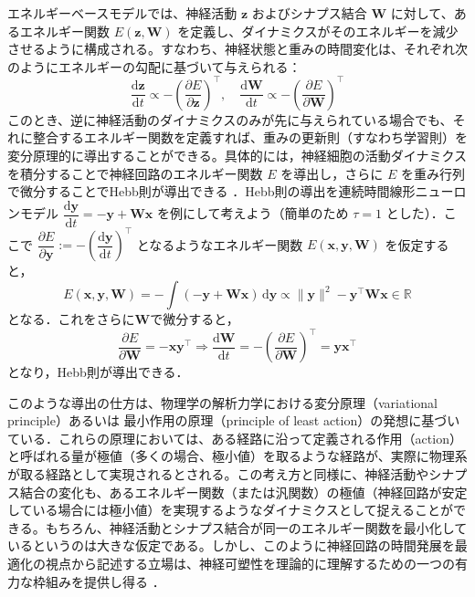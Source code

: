 \documentclass[titlepage]{ltjsbook}
\begin{document}
エネルギーベースモデルでは、神経活動 $\mathbf{z}$ およびシナプス結合 $\mathbf{W}$ に対して、あるエネルギー関数 $E(\mathbf{z}, \mathbf{W})$ を定義し、ダイナミクスがそのエネルギーを減少させるように構成される。すなわち、神経状態と重みの時間変化は、それぞれ次のようにエネルギーの勾配に基づいて与えられる：
\begin{equation}
\frac{\mathrm{d}\mathbf{z}}{\mathrm{d}t}\propto-\left(\frac{\partial E}{\partial \mathbf{z}}\right)^\top,\quad \frac{\mathrm{d} \mathbf{W}}{\mathrm{d}t}\propto-\left(\frac{\partial E}{\partial \mathbf{W}}\right)^\top
\end{equation}
このとき、逆に神経活動のダイナミクスのみが先に与えられている場合でも、それに整合するエネルギー関数を定義すれば、重みの更新則（すなわち学習則）を変分原理的に導出することができる。具体的には，神経細胞の活動ダイナミクスを積分することで神経回路のエネルギー関数 $E$ を導出し，さらに $E$ を重み行列で微分することでHebb則が導出できる \citep{Isomura2020-sn}．Hebb則の導出を連続時間線形ニューロンモデル $\dfrac{\mathrm{d}\mathbf{y}}{\mathrm{d}t}=-\mathbf{y}+\mathbf{W}\mathbf{x}$ を例にして考えよう（簡単のため $\tau=1$ とした）．ここで $\dfrac{\partial E}{\partial\mathbf{y}}:=-\left(\dfrac{\mathrm{d}\mathbf{y}}{\mathrm{d}t}\right)^\top$ となるようなエネルギー関数 $E(\mathbf{x}, \mathbf{y}, \mathbf{W})$ を仮定すると，
\begin{equation}
E(\mathbf{x}, \mathbf{y}, \mathbf{W})=-\int \left(-\mathbf{y}+\mathbf{W}\mathbf{x}\right)\,\mathrm{d}\mathbf{y}\propto\|\mathbf{y}\|^2-\mathbf{y}^\top \mathbf{W}\mathbf{x} \in \mathbb{R}
\end{equation}
となる．これをさらに$\mathbf{W}$で微分すると，
\begin{equation}
\dfrac{\partial E}{\partial\mathbf{W}}=-\mathbf{x}\mathbf{y}^\top\Rightarrow
\frac{\mathrm{d}\mathbf{W}}{\mathrm{d}t}=-\left(\frac{\partial E}{\partial \mathbf{W}}\right)^\top=\mathbf{y}\mathbf{x}^\top
\end{equation}
となり，Hebb則が導出できる．

このような導出の仕方は、物理学の解析力学における変分原理（variational principle）あるいは 最小作用の原理（principle of least action）の発想に基づいている．これらの原理においては、ある経路に沿って定義される作用（action）と呼ばれる量が極値（多くの場合、極小値）を取るような経路が、実際に物理系が取る経路として実現されるとされる。この考え方と同様に、神経活動やシナプス結合の変化も、あるエネルギー関数（または汎関数）の極値（神経回路が安定している場合には極小値）を実現するようなダイナミクスとして捉えることができる。もちろん、神経活動とシナプス結合が同一のエネルギー関数を最小化しているというのは大きな仮定である。しかし、このように神経回路の時間発展を最適化の視点から記述する立場は、神経可塑性を理論的に理解するための一つの有力な枠組みを提供し得る \citep{isomura2023experimental}．
\end{document}
